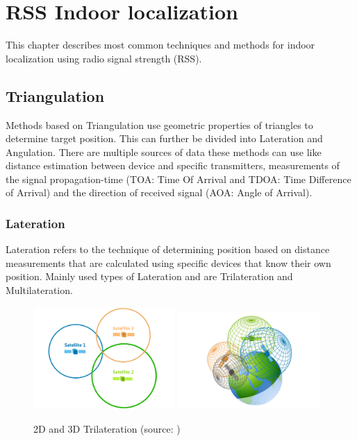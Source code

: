 \chapter{RSS Indoor localization}\label{sec:RSSIndoorLocalization}
This chapter describes most common techniques and methods for indoor localization using radio signal strength (RSS).

\section{Triangulation}\label{sec:Triangulation}
Methods based on Triangulation use geometric properties of triangles to determine target position. This can further be divided into Lateration and Angulation. \cite{RAinWILTaS} There are multiple sources of data these methods can use like distance estimation between device and specific transmitters, measurements of the signal propagation-time (TOA: Time Of Arrival and TDOA: Time Difference of Arrival\cite{LTinWSN}) and the direction of received
signal (AOA: Angle of Arrival\cite{AoALforWSN}).

\subsection{Lateration}\label{sec:Lateration}
Lateration refers to the technique of determining position based on distance measurements that are calculated using specific devices that know their own position.  Mainly used types of Lateration and are Trilateration and Multilateration. 

\begin{figure}[h!]
	\begin{centering}
		\includegraphics[width=0.48\textwidth]{img/trilateration_2d}
		\includegraphics[width=0.48\textwidth]{img/trilateration_3d}
		\par\end{centering}
	\caption{2D and 3D Trilateration (source: \cite{TvTHGPSRW})\label{fig:2d_and_3d_trilateration}}
	\label{fig2}
\end{figure}


